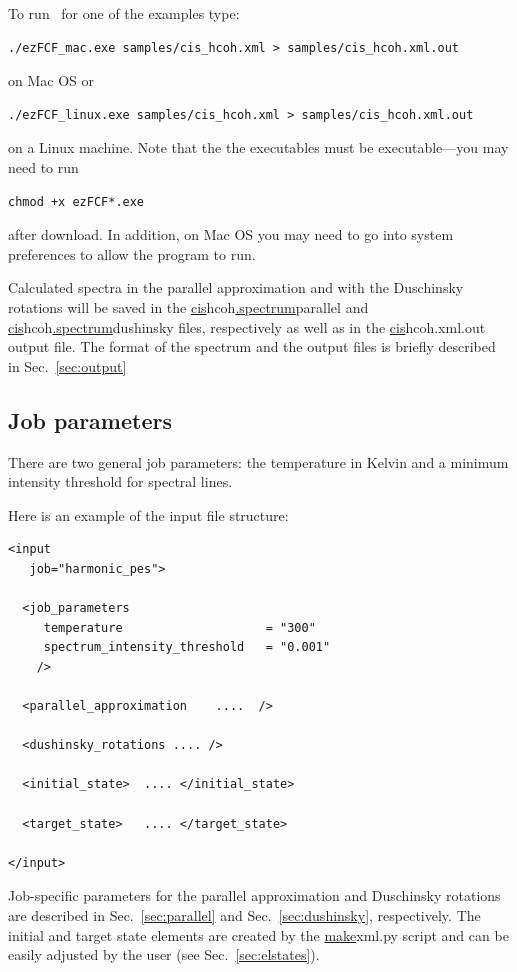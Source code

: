 \documentclass[11pt]{article}
\begin{document}
To run \ezFCF\ for one of the examples type:
\begin{lstlisting}[frame=single,framerule=0pt]
  ./ezFCF_mac.exe samples/cis_hcoh.xml > samples/cis_hcoh.xml.out
\end{lstlisting}
on Mac OS or
\begin{lstlisting}[frame=single,framerule=0pt]
  ./ezFCF_linux.exe samples/cis_hcoh.xml > samples/cis_hcoh.xml.out
\end{lstlisting}
on a Linux machine. 
Note that the the executables must be executable---you may need to run
\begin{lstlisting}[frame=single,framerule=0pt]
  chmod +x ezFCF*.exe
\end{lstlisting}
after download. In addition, on Mac OS you may need to go into system preferences to allow the program to run. 

Calculated spectra in the parallel approximation 
and with the Duschinsky rotations will be saved in the \ul{cis}{hcoh}\ul{.spectrum}{parallel} and
\ul{cis}{hcoh}\ul{.spectrum}{dushinsky} files, respectively as well as in the \ul{cis}{hcoh.xml.out} output file. 
The format of the spectrum and the output files is briefly described in Sec.~\ref{sec:output}


\subsection{Job parameters}
\label{sec:parameters}

There are two general job parameters: the temperature in Kelvin 
and a minimum intensity threshold for spectral lines.

Here is an example of the input file structure:
\begin{lstlisting}[frame=single,framerule=0pt]
<input 
   job="harmonic_pes">

  <job_parameters 
     temperature                    = "300"
     spectrum_intensity_threshold   = "0.001"
    />

  <parallel_approximation    ....  />

  <dushinsky_rotations .... />

  <initial_state>  .... </initial_state>

  <target_state>   .... </target_state>

</input>
\end{lstlisting}

Job-specific parameters for the parallel approximation and Duschinsky rotations are described
in Sec.~\ref{sec:parallel} and Sec.~\ref{sec:dushinsky}, respectively. The initial and target state elements are created 
by the \ul{make}{xml.py} script and can be easily adjusted by the user (see Sec.~\ref{sec:elstates}).
\end{document}
